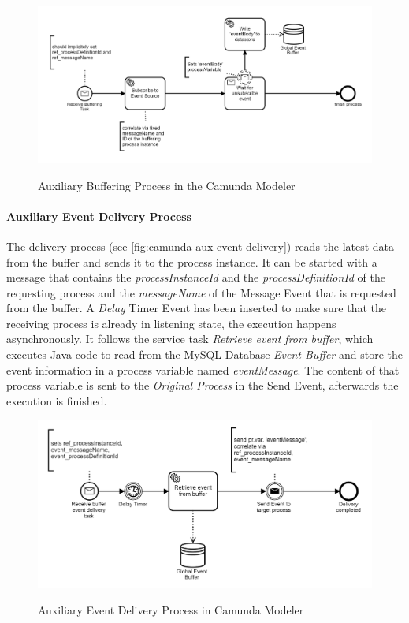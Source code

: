 \begin{figure}[]
	\myfloatalign
	{\includegraphics[width=1\linewidth]{chapters/assessment/buffering-process.PNG}}
	\caption{Auxiliary Buffering Process in the Camunda Modeler}\label{fig:camunda-aux-buffering-process}
\end{figure}

\paragraph{Auxiliary Event Delivery Process}
The delivery process (see \autoref{fig:camunda-aux-event-delivery}) reads the latest data from the buffer and sends it to the process instance. It can be started with a message that contains the \textit{processInstanceId} and the \textit{processDefinitionId} of the requesting process and the \textit{messageName} of the Message Event that is requested from the buffer.
A \textit{Delay} Timer Event has been inserted to make sure that the receiving process is already in listening state, the execution happens asynchronously.
It follows the service task \textit{Retrieve event from buffer}, which executes Java code to read from the MySQL Database \textit{Event Buffer} and store the event information in a process variable named \textit{eventMessage}.
The content of that process variable is sent to the \textit{Original Process} in the Send Event, afterwards the execution is finished.


\begin{figure}[]
	\myfloatalign
	{\includegraphics[width=1\linewidth]{chapters/assessment/buffer-delivery-process.PNG}}
	\caption{Auxiliary Event Delivery Process in Camunda Modeler}\label{fig:camunda-aux-event-delivery}
\end{figure}


